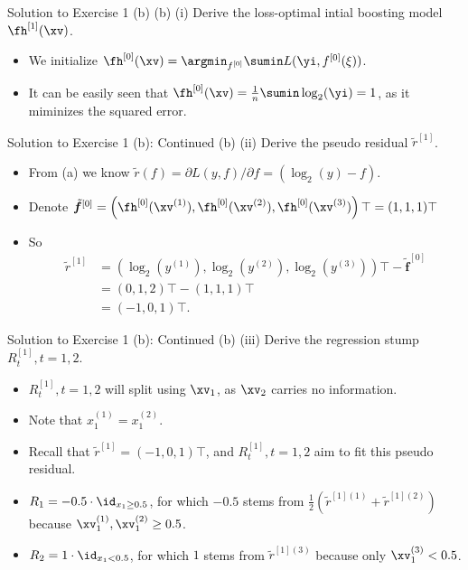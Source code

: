 \documentclass[aspectratio=169]{beamer}
\newcommand{\fhx}[1]{\fh^{[#1]}(\xv)}
\newcommand{\rtilde}[1]{\tilde{r}^{[#1]}}
\newcommand{\Rt}[1]{R_t^{[#1]}}
\newcommand{\fhv}[1]{\tilde{\bm{f}}^{[#1]}}
\begin{document}
\begin{frame}{Solution to Exercise 1 (b)}
	(b) (i) Derive the loss-optimal intial boosting model $\fhx{1}$.
	\begin{itemize}
		\item<2-> We initialize $\fhx{0} = \argmin_{f^{[0]}} \sumin L(\yi, f^{[0]}(\xi))$.
		\item<3-> It can be easily seen that $\fhx{0} = \frac{1}{n} \sumin \log_2(\yi) = 1$, as it miminizes the squared error.
	\end{itemize}
\end{frame}

\begin{frame}{Solution to Exercise 1 (b): Continued}
	(b) (ii) Derive the pseudo residual $\rtilde{1}$.
	\begin{itemize}
		\item<2-> From (a) we know $\tilde{r} (f) = \partial L(y,f) / \partial f = (\log_2(y) - f)$.
		\item<3-> Denote $\fhv{0} = \left(\fh^{[0]}(\xv^{(1)}), \fh^{[0]}(\xv^{(2)}), \fh^{[0]}(\xv^{(3)}) \right)\top = (1, 1, 1)\top$
		\item<4-> So 
			\begin{align*}
				\rtilde{1} &= \left(\log_2(y^{(1)}), \log_2(y^{(2)}), \log_2(y^{(3)})\right)\top - \fhv{0} \\
				&= (0, 1, 2)\top - (1, 1, 1)\top \\
				&= (-1, 0, 1)\top.
			\end{align*}
	\end{itemize}
\end{frame}

\begin{frame}{Solution to Exercise 1 (b): Continued}
	(b) (iii) Derive the regression stump $\Rt{1}, t = 1, 2$.
	\begin{itemize}
		\item<2-> $\Rt{1}, t = 1, 2$ will split using $\xv_1$, as $\xv_2$ carries no information.
		\item<3-> Note that $x_1^{(1)} = x_1^{(2)}$.
		\item<4-> Recall that $\rtilde{1} = (-1, 0, 1)\top$, and $\Rt{1}, t=1, 2$ aim to fit this pseudo residual.
		\item<5-> $R_1 = - 0.5 \cdot \id_{x_1 \geq 0.5}$, for which $-0.5$ stems from $\frac{1}{2}(\tilde{r}^{[1](1)} + \tilde{r}^{[1](2)})$ because $\xv_1^{(1)} , \xv_1^{(2)} \geq 0.5$.
		\item<6-> $R_2 = 1 \cdot \id_{x_1 < 0.5}$, for which $1$ stems from $\tilde{r}^{[1](3)}$ because only $\xv_1^{(3)} < 0.5$.
	\end{itemize}
\end{frame}
\end{document}

